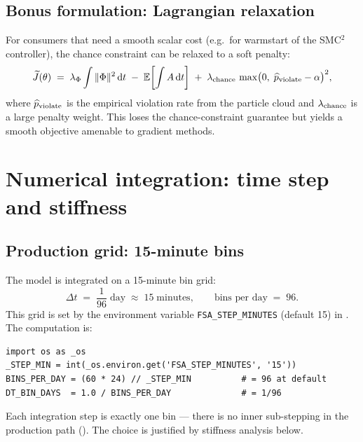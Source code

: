 \documentclass[11pt,a4paper]{article}
\theoremstyle{definition}
\newcommand{\dd}{\mathrm{d}}
\newcommand{\Ecal}{\mathbb{E}}
\begin{document}
\subsection{Bonus formulation: Lagrangian relaxation}

For consumers that need a smooth scalar cost (e.g.\ for warmstart of
the SMC$^2$ controller), the chance constraint can be relaxed to a
soft penalty:
\begin{equation}
\widetilde J(\theta) \;=\; \lambda_\Phi \int \|\Phi\|^2 \, \dd t
   \;-\; \Ecal\!\left[\int A \, \dd t\right]
   \;+\; \lambda_{\rm chance} \, \max\!\big(0,\; \widehat p_{\rm violate} - \alpha\big)^2,
\end{equation}
where $\widehat p_{\rm violate}$ is the empirical violation rate from
the particle cloud and $\lambda_{\rm chance}$ is a large penalty
weight. This loses the chance-constraint guarantee but yields a smooth
objective amenable to gradient methods.


\section{Numerical integration: time step and stiffness} \label{sec:integration}

\subsection{Production grid: 15-minute bins}

The model is integrated on a 15-minute bin grid:
\begin{equation}
\Delta t \;=\; \frac{1}{96}\;\text{day} \;\approx\; 15\;\text{minutes}, \qquad
\text{bins per day} \;=\; 96.
\end{equation}
This grid is set by the environment variable \texttt{FSA\_STEP\_MINUTES}
(default 15) in . The
computation is:
\begin{lstlisting}
import os as _os
_STEP_MIN = int(_os.environ.get('FSA_STEP_MINUTES', '15'))
BINS_PER_DAY = (60 * 24) // _STEP_MIN          # = 96 at default
DT_BIN_DAYS  = 1.0 / BINS_PER_DAY              # = 1/96
\end{lstlisting}

Each integration step is exactly one bin --- there is no inner
sub-stepping in the production path
(). The choice is justified by stiffness
analysis below.
\end{document}
